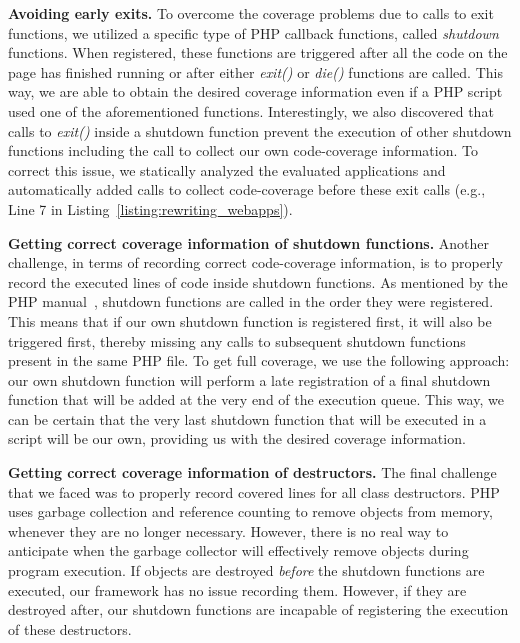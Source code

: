 \vspace{1ex}
\noindent\textbf{Avoiding early exits.}
To overcome the coverage problems due to calls to exit functions, we
utilized a specific type of PHP callback functions, called \textit{shutdown}
functions. When registered, these functions are triggered after all the
code on the page has finished running or after either \textit{exit()} or
\textit{die()} functions are called. This way, we are able to obtain the
desired coverage information even if a PHP script used one of the aforementioned functions.
Interestingly, we also discovered that calls to \textit{exit()} inside a
shutdown function prevent the execution of other shutdown functions
including the call to collect our own code-coverage information. To correct
this issue, we statically analyzed the evaluated applications and automatically
added calls to collect code-coverage before these exit calls (e.g., Line 7
in Listing~\ref{listing:rewriting_webapps}).

\vspace{1ex}
\noindent\textbf{Getting correct coverage information of shutdown functions.}
Another challenge, in terms of recording correct code-coverage information,
is to properly record the executed lines of code inside shutdown functions. As
mentioned by the PHP manual~\cite{phpshutdown}, shutdown functions are called
in the order they were registered. This means that if our own shutdown function
is registered first, it will also be triggered first, thereby missing any
calls to subsequent shutdown functions present in the same PHP file. To get
full coverage, we use the following approach: our own shutdown function will
perform a late registration of a final shutdown function that will be added
at the very end of the execution queue. This way, we can be certain that
the very last shutdown function that will be executed in a script will be
our own, providing us with the desired coverage information.


\vspace{1ex}
\noindent\textbf{Getting correct coverage information of destructors.}
The final challenge that we faced was to properly record covered lines for
all class destructors. PHP uses garbage collection and reference counting to
remove objects from memory, whenever they are no longer necessary. However,
there is no real way to anticipate when the garbage collector will effectively
remove objects during program execution. If objects are destroyed \emph{before}
the shutdown functions are executed, our framework has no issue recording
them. However, if they are destroyed after, our shutdown functions are
incapable of registering the execution of these destructors.

